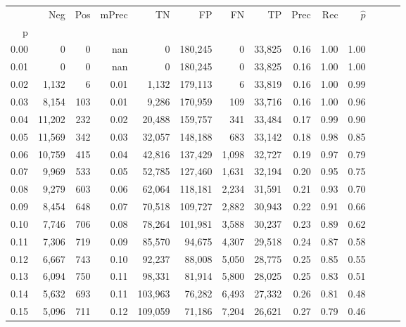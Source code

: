 \begin{tabular}{rrrrrrrrrrrrrr}
\toprule
{} &     Neg &  Pos & mPrec &       TN &       FP &      FN &      TP &  Prec &   Rec & $\hat{p}$ \\
p    &         &      &       &          &          &         &         &       &       &           \\
\midrule
0.00 &       0 &    0 &   nan &        0 &  180,245 &       0 &  33,825 &  0.16 &  1.00 &      1.00 \\
0.01 &       0 &    0 &   nan &        0 &  180,245 &       0 &  33,825 &  0.16 &  1.00 &      1.00 \\
0.02 &   1,132 &    6 &  0.01 &    1,132 &  179,113 &       6 &  33,819 &  0.16 &  1.00 &      0.99 \\
0.03 &   8,154 &  103 &  0.01 &    9,286 &  170,959 &     109 &  33,716 &  0.16 &  1.00 &      0.96 \\
0.04 &  11,202 &  232 &  0.02 &   20,488 &  159,757 &     341 &  33,484 &  0.17 &  0.99 &      0.90 \\
0.05 &  11,569 &  342 &  0.03 &   32,057 &  148,188 &     683 &  33,142 &  0.18 &  0.98 &      0.85 \\
0.06 &  10,759 &  415 &  0.04 &   42,816 &  137,429 &   1,098 &  32,727 &  0.19 &  0.97 &      0.79 \\
0.07 &   9,969 &  533 &  0.05 &   52,785 &  127,460 &   1,631 &  32,194 &  0.20 &  0.95 &      0.75 \\
0.08 &   9,279 &  603 &  0.06 &   62,064 &  118,181 &   2,234 &  31,591 &  0.21 &  0.93 &      0.70 \\
0.09 &   8,454 &  648 &  0.07 &   70,518 &  109,727 &   2,882 &  30,943 &  0.22 &  0.91 &      0.66 \\
0.10 &   7,746 &  706 &  0.08 &   78,264 &  101,981 &   3,588 &  30,237 &  0.23 &  0.89 &      0.62 \\
0.11 &   7,306 &  719 &  0.09 &   85,570 &   94,675 &   4,307 &  29,518 &  0.24 &  0.87 &      0.58 \\
0.12 &   6,667 &  743 &  0.10 &   92,237 &   88,008 &   5,050 &  28,775 &  0.25 &  0.85 &      0.55 \\
0.13 &   6,094 &  750 &  0.11 &   98,331 &   81,914 &   5,800 &  28,025 &  0.25 &  0.83 &      0.51 \\
0.14 &   5,632 &  693 &  0.11 &  103,963 &   76,282 &   6,493 &  27,332 &  0.26 &  0.81 &      0.48 \\
0.15 &   5,096 &  711 &  0.12 &  109,059 &   71,186 &   7,204 &  26,621 &  0.27 &  0.79 &      0.46 \\

\end{tabular}
